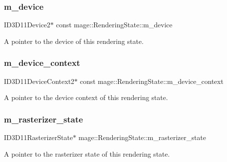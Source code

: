 \subsubsection{\texorpdfstring{m\+\_\+device}{m\_device}}
{\footnotesize\ttfamily I\+D3\+D11\+Device2$\ast$ const mage\+::\+Rendering\+State\+::m\+\_\+device\hspace{0.3cm}{\ttfamily [private]}}

A pointer to the device of this rendering state. \hypertarget{structmage_1_1_rendering_state_a13e46783f38a60fe032dc2aad708ec48}{}\label{structmage_1_1_rendering_state_a13e46783f38a60fe032dc2aad708ec48} 
\subsubsection{\texorpdfstring{m\+\_\+device\+\_\+context}{m\_device\_context}}
{\footnotesize\ttfamily I\+D3\+D11\+Device\+Context2$\ast$ const mage\+::\+Rendering\+State\+::m\+\_\+device\+\_\+context\hspace{0.3cm}{\ttfamily [private]}}

A pointer to the device context of this rendering state. \hypertarget{structmage_1_1_rendering_state_a63b8c00bd0e2e1c56bd2a42f269733a8}{}\label{structmage_1_1_rendering_state_a63b8c00bd0e2e1c56bd2a42f269733a8} 
\subsubsection{\texorpdfstring{m\+\_\+rasterizer\+\_\+state}{m\_rasterizer\_state}}
{\footnotesize\ttfamily I\+D3\+D11\+Rasterizer\+State$\ast$ mage\+::\+Rendering\+State\+::m\+\_\+rasterizer\+\_\+state\hspace{0.3cm}{\ttfamily [private]}}

A pointer to the rasterizer state of this rendering state. \hypertarget{structmage_1_1_rendering_state_a8d422a14392f89eec1ece2d917511168}{}\label{structmage_1_1_rendering_state_a8d422a14392f89eec1ece2d917511168} 
